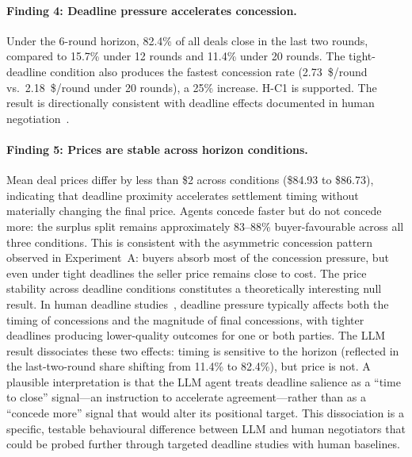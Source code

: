 \paragraph{Finding 4: Deadline pressure accelerates concession.}
Under the 6-round horizon, 82.4\% of all deals close in the last two rounds, compared to 15.7\% under 12 rounds and 11.4\% under 20 rounds.  The tight-deadline condition also produces the fastest concession rate (2.73~\$/round vs.\ 2.18~\$/round under 20 rounds), a 25\% increase.  H-C1 is supported.  The result is directionally consistent with deadline effects documented in human negotiation~\cite{roth1988deadline}.

\paragraph{Finding 5: Prices are stable across horizon conditions.}
Mean deal prices differ by less than \$2 across conditions (\$84.93 to \$86.73), indicating that deadline proximity accelerates settlement timing without materially changing the final price.  Agents concede faster but do not concede more: the surplus split remains approximately 83--88\% buyer-favourable across all three conditions.  This is consistent with the asymmetric concession pattern observed in Experiment~A: buyers absorb most of the concession pressure, but even under tight deadlines the seller price remains close to cost.  The price stability across deadline conditions constitutes a theoretically interesting null result.  In human deadline studies~\cite{roth1988deadline}, deadline pressure typically affects both the timing of concessions and the magnitude of final concessions, with tighter deadlines producing lower-quality outcomes for one or both parties.  The LLM result dissociates these two effects: timing is sensitive to the horizon (reflected in the last-two-round share shifting from 11.4\% to 82.4\%), but price is not.  A plausible interpretation is that the LLM agent treats deadline salience as a ``time to close'' signal---an instruction to accelerate agreement---rather than as a ``concede more'' signal that would alter its positional target.  This dissociation is a specific, testable behavioural difference between LLM and human negotiators that could be probed further through targeted deadline studies with human baselines.


